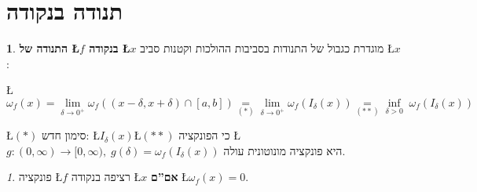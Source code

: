 \documentclass[english,hebrew]{article}
\theoremstyle{remark}
\theoremstyle{definition}
\newtheorem*{defn*}{\protect\definitionname}
\theoremstyle{plain}
\theoremstyle{remark}
\newtheorem{claim}[thm]{\protect\claimname}
\theoremstyle{plain}
\theoremstyle{plain}
\providecommand{\claimname}{טענה}
\providecommand{\definitionname}{הגדרה}
\begin{document}
\section{תנודה בנקודה}
\begin{defn*}
\textbf{התנודה של \L{$f$} בנקודה \L{$x$}} מוגדרת כגבול של התנודות
בסביבות ההולכות וקטנות סביב \L{$x$}:

\L{%
\[
\omega_{f}(x)=\lim_{\delta\to0^{+}}\omega_{f}((x-\delta,x+\delta)\cap[a,b])\underset{(*)}{=}\lim_{\delta\to0^{+}}\omega_{f}(I_{\delta}(x))\underset{(**)}{=}\underset{\delta>0}{\inf}\;\omega_{f}\left(I_{\delta}(x)\right)
\]
}%

\L{$(*)$} סימון חדש: \L{$I_{\delta}(x)$}\qquad{}\L{$(**)$} כי
הפונקציה \L{$g:(0,\infty)\rightarrow[0,\infty),\;g(\delta)=\omega_{f}\left(I_{\delta}(x)\right)$}
היא פונקציה מונוטונית עולה.
\end{defn*}
\begin{claim}
פונקציה \L{$f$} רציפה בנקודה \L{$x$} \textbf{אם\textquotedblright ם}
\L{$\omega_{f}(x)=0$}.
\end{claim}
\end{document}
